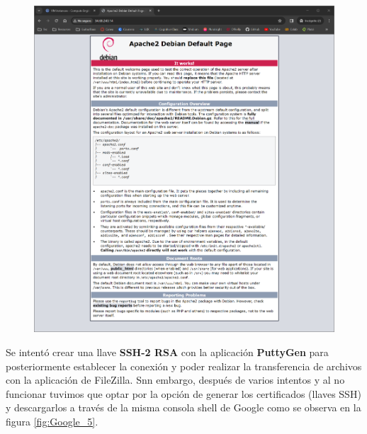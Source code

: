 \documentclass[12pt,a4paper]{article}
\begin{document}
\begin{figure}[H]
    \centering
    \includegraphics[width=1\linewidth]{M4_Servicios_Cómputo_en_la_Nube/Tarea_5_Creación_Máquinas_Virtuales_en_Nube/reporte/figuras/2_3_1_Configuración_Pública.png}
    \label{fig:Google_4}
\end{figure}

Se intentó crear una llave \textbf{SSH-2 RSA} con la aplicación \textbf{PuttyGen} para posteriormente establecer la conexión y poder realizar la transferencia de archivos con la aplicación de FileZilla. Snn embargo, después de varios intentos y al no funcionar tuvimos que optar por la opción de generar los certificados (llaves SSH) y descargarlos a través de la misma consola shell de Google como se observa en la figura \ref{fig:Google_5}.
\end{document}
